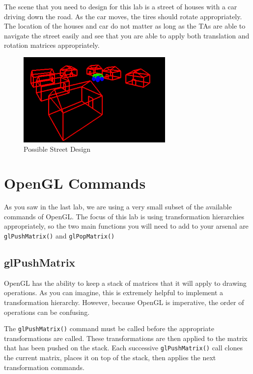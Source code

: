 \documentclass[11pt]{article}
\begin{document}
The scene that you need to design for this lab is a street of houses with a car driving down the road. As the car moves, the tires should rotate appropriately. The location of the houses and car do not matter as long as the TAs are able to navigate the street easily and see that you are able to apply both translation and rotation matrices appropriately.

\begin{figure}[hbt!]
	\begin{center}
		\includegraphics[width=3.0in]{street.png}
	\end{center}
	\caption{Possible Street Design}
	\label{fig:street}
\end{figure}

\section*{OpenGL Commands}

As you saw in the last lab, we are using a very small subset of the available commands of OpenGL. The focus of this lab is using transformation hierarchies appropriately, so the two main functions you will need to add to your arsenal are {\tt glPushMatrix()} and {\tt glPopMatrix()}

\subsection*{glPushMatrix}

OpenGL has the ability to keep a stack of matrices that it will apply to drawing operations. As you can imagine, this is extremely helpful to implement a transformation hierarchy. However, because OpenGL is imperative, the order of operations can be confusing.

The {\tt glPushMatrix()} command must be called before the appropriate transformations are called. These transformations are then applied to the matrix that has been pushed on the stack. Each successive {\tt glPushMatrix()} call clones the current matrix, places it on top of the stack, then applies the next transformation commands.
\end{document}
